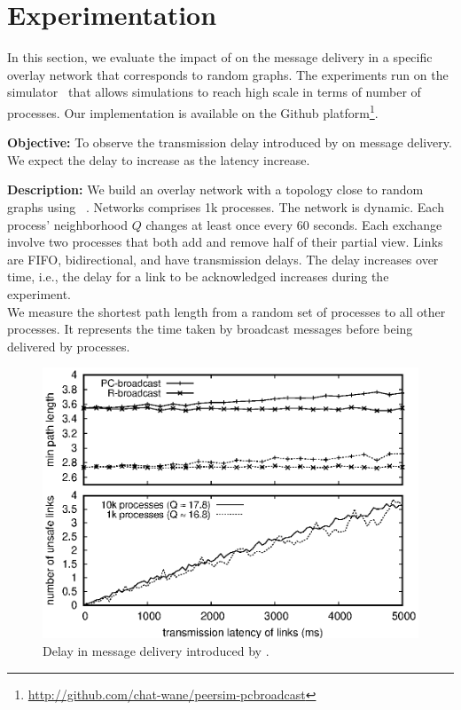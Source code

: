 
\section{Experimentation}
\label{sec:experimentation}


In this section, we evaluate the impact of \CBROADCAST on the message delivery
in a specific overlay network that corresponds to random graphs. The experiments
run on the \PEERSIM simulator~\cite{montresor2009peersim} that allows
simulations to reach high scale in terms of number of processes. Our
implementation is available on the Github
platform\footnote{\url{http://github.com/chat-wane/peersim-pcbroadcast}}.


\noindent \textbf{Objective:} To observe the transmission delay introduced by
\CBROADCAST on message delivery. We expect the delay to increase as the latency
increase.

\noindent \textbf{Description:} We build an overlay network with a topology
close to random graphs using \SPRAY~\cite{nedelec2017adaptive}. Networks
comprises 1k processes. The network is dynamic. Each process' neighborhood $Q$
changes at least once every 60 seconds. Each exchange involve two processes that
both add and remove half of their partial view.  Links are FIFO, bidirectional,
and have transmission delays. The delay increases over time, i.e., the delay for 
a link to be acknowledged increases during the experiment.\\
We measure the shortest path length from a random set of processes to all other
processes. It represents the time taken by broadcast messages before being
delivered by processes.

\begin{figure}
  \begin{center}
    \includegraphics[width=1.4\columnwidth]{./img/delay.eps}
    \caption{\label{fig:delay}Delay in message delivery introduced by \CBROADCAST.}
  \end{center}
\end{figure}


